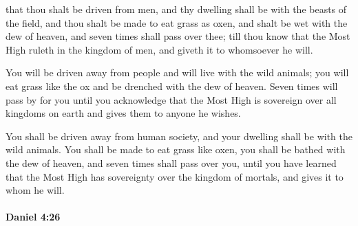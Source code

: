 			\begin{versebox}
					\item[BHS] 
					\item[LXX] 
					\item[ASV] that thou shalt be driven from men, and thy dwelling shall be with the beasts of the field, and thou shalt be made to eat grass as oxen, and shalt be wet with the dew of heaven, and seven times shall pass over thee; till thou know that the Most High ruleth in the kingdom of men, and giveth it to whomsoever he will.
					\item[NIV] You will be driven away from people and will live with the wild animals; you will eat grass like the ox and be drenched with the dew of heaven. Seven times will pass by for you until you acknowledge that the Most High is sovereign over all kingdoms on earth and gives them to anyone he wishes.
					\item[NRSV] You shall be driven away from human society, and your dwelling shall be with the wild animals. You shall be made to eat grass like oxen, you shall be bathed with the dew of heaven, and seven times shall pass over you, until you have learned that the Most High has sovereignty over the kingdom of mortals, and gives it to whom he will.
			\end{versebox}

		\paragraph{Daniel 4:26} %
			\label{DANIEL-4-26}

